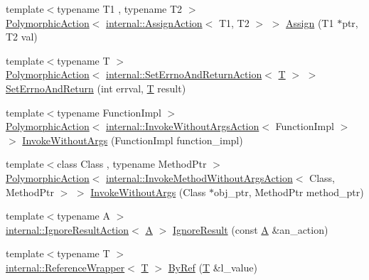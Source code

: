 \begin{DoxyCompactItemize}
\item 
{\footnotesize template$<$typename T1 , typename T2 $>$ }\\\hyperlink{classtesting_1_1_polymorphic_action}{Polymorphic\+Action}$<$ \hyperlink{classtesting_1_1internal_1_1_assign_action}{internal\+::\+Assign\+Action}$<$ T1, T2 $>$ $>$ \hyperlink{namespacetesting_abfc4121b8708e8b22a096ff8be88a9d0}{Assign} (T1 $\ast$ptr, T2 val)
\item 
{\footnotesize template$<$typename T $>$ }\\\hyperlink{classtesting_1_1_polymorphic_action}{Polymorphic\+Action}$<$ \hyperlink{classtesting_1_1internal_1_1_set_errno_and_return_action}{internal\+::\+Set\+Errno\+And\+Return\+Action}$<$ \hyperlink{functions__7_8js_adf1f3edb9115acb0a1e04209b7a9937b}{T} $>$ $>$ \hyperlink{namespacetesting_a31095e421f167fade2e6d4d60df1f4da}{Set\+Errno\+And\+Return} (int errval, \hyperlink{functions__7_8js_adf1f3edb9115acb0a1e04209b7a9937b}{T} result)
\item 
{\footnotesize template$<$typename Function\+Impl $>$ }\\\hyperlink{classtesting_1_1_polymorphic_action}{Polymorphic\+Action}$<$ \hyperlink{classtesting_1_1internal_1_1_invoke_without_args_action}{internal\+::\+Invoke\+Without\+Args\+Action}$<$ Function\+Impl $>$ $>$ \hyperlink{namespacetesting_a88cc1999296bc630f6a49cdf66bb21f9}{Invoke\+Without\+Args} (Function\+Impl function\+\_\+impl)
\item 
{\footnotesize template$<$class Class , typename Method\+Ptr $>$ }\\\hyperlink{classtesting_1_1_polymorphic_action}{Polymorphic\+Action}$<$ \hyperlink{classtesting_1_1internal_1_1_invoke_method_without_args_action}{internal\+::\+Invoke\+Method\+Without\+Args\+Action}$<$ Class, Method\+Ptr $>$ $>$ \hyperlink{namespacetesting_ab75325d71a8c37db94f349243815c728}{Invoke\+Without\+Args} (Class $\ast$obj\+\_\+ptr, Method\+Ptr method\+\_\+ptr)
\item 
{\footnotesize template$<$typename A $>$ }\\\hyperlink{classtesting_1_1internal_1_1_ignore_result_action}{internal\+::\+Ignore\+Result\+Action}$<$ \hyperlink{namespacetesting_a5e9134d655d2fc9323902348083282e7}{A} $>$ \hyperlink{namespacetesting_a50ae42540a31047c7fddd32df8d835f5}{Ignore\+Result} (const \hyperlink{namespacetesting_a5e9134d655d2fc9323902348083282e7}{A} \&an\+\_\+action)
\item 
{\footnotesize template$<$typename T $>$ }\\\hyperlink{classtesting_1_1internal_1_1_reference_wrapper}{internal\+::\+Reference\+Wrapper}$<$ \hyperlink{functions__7_8js_adf1f3edb9115acb0a1e04209b7a9937b}{T} $>$ \hyperlink{namespacetesting_aaee6d42dcd69de6e7a1459c5c71222c3}{By\+Ref} (\hyperlink{functions__7_8js_adf1f3edb9115acb0a1e04209b7a9937b}{T} \&l\+\_\+value)

\end{DoxyCompactItemize}
